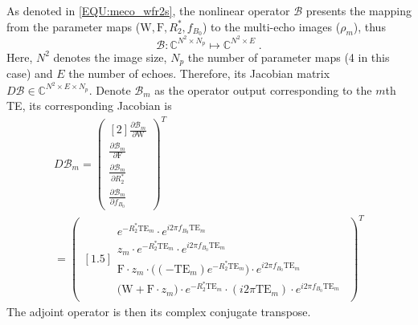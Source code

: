 \documentclass[journal,twoside,web]{ieeecolor}
\begin{document}
\begin{appendices}
As denoted in \cref{EQU:meco_wfr2s}, the nonlinear operator $\mathcal{B}$ presents the mapping 
from the parameter maps ($\text{W}, \text{F}, R_2^*, f_{B_0}$) 
to the multi-echo images ($\rho_m$), thus 
\begin{equation} \label{EQU:B_mapping}
\mathcal{B} : \mathbb{C}^{N^2 \times N_p} \mapsto \mathbb{C}^{N^2 \times E} \; .
\end{equation}
Here, $N^2$ denotes the image size, $N_p$ the number of parameter maps 
(4 in this case) and $E$ the number of echoes.
Therefore, its Jacobian matrix $D \mathcal{B} \in \mathbb{C}^{N^2 \times E \times N_p}$. 
Denote $\mathcal{B}_m$ as the operator output corresponding to the $m$th TE, 
its corresponding Jacobian is
\begin{multline*}
D\mathcal{B}_m = 
\begin{pmatrix}[2]
\frac{\partial \mathcal{B}_m}{\partial \text{W}} \\
\frac{\partial \mathcal{B}_m}{\partial \text{F}} \\
\frac{\partial \mathcal{B}_m}{\partial {R_2^*}} \\
\frac{\partial \mathcal{B}_m}{\partial f_{B_0}}
\end{pmatrix}^T \\ = 
\begin{pmatrix}[1.5]
\begin{array}{r}
e^{-{R_2^*} \text{TE}_m} \cdot e^{i2\pi f_{B_0} \text{TE}_m} \\
z_m \cdot e^{-{R_2^*} \text{TE}_m} \cdot e^{i2\pi f_{B_0} \text{TE}_m} \\
\text{F} \cdot z_m \cdot \Big( (-\text{TE}_m) e^{-{R_2^*} \text{TE}_m} \Big) \cdot e^{i2\pi f_{B_0} \text{TE}_m} \\
\Big( \text{W} + \text{F} \cdot z_m \Big) \cdot e^{-{R_2^*} \text{TE}_m} \cdot (i2\pi \text{TE}_m) \cdot e^{i2\pi f_{B_0} \text{TE}_m}
\end{array}
\end{pmatrix}^T
\end{multline*}
The adjoint operator is then its complex conjugate transpose.



\end{appendices}
\end{document}

